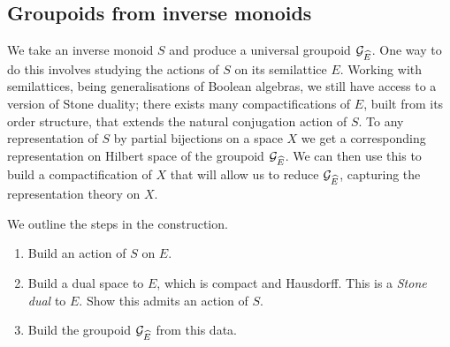 \subsection{Groupoids from inverse monoids}
We take an inverse monoid $S$ and produce a universal groupoid $\mathcal{G}_{\widehat{E}}$. One way to do this involves studying the actions of $S$ on its semilattice $E$. Working with semilattices, being generalisations of Boolean algebras, we still have access to a version of Stone duality; there exists many compactifications of $E$, built from its order structure, that extends the natural conjugation action of $S$. To any representation of $S$  by partial bijections on a space $X$ we get a corresponding representation on Hilbert space of the groupoid $\mathcal{G}_{\widehat{E}}$. We can then use this to build a compactification of $X$ that will allow us to reduce $\mathcal{G}_{\widehat{E}}$, capturing the representation theory on $X$.

We outline the steps in the construction.
\begin{enumerate}
\item Build an action of $S$ on $E$.
\item Build a dual space to $E$, which is compact and Hausdorff. This is a \textit{Stone dual} to $E$. Show this admits an action of $S$.
\item Build the groupoid $\mathcal{G}_{\widehat{E}}$ from this data.
\end{enumerate}

